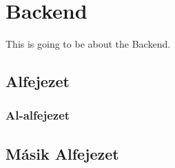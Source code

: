 \chapter{Backend}

This is going to be about the Backend.

\section{Alfejezet}
\lipsum[1]
\subsection{Al-alfejezet}
\lipsum[1-2]

\section{Másik Alfejezet}
\lipsum[1-2]

\lipsum
